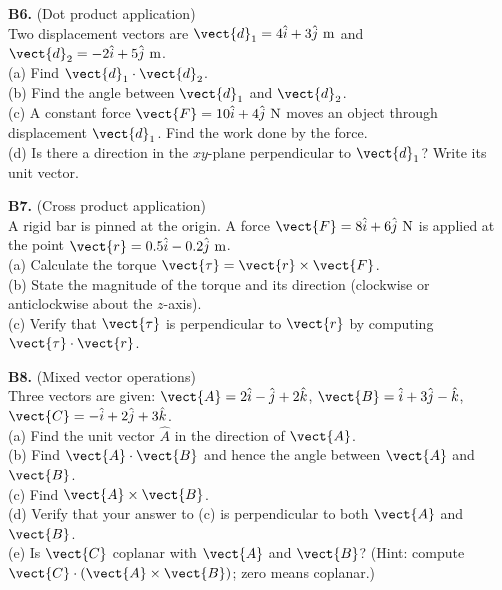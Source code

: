 \begin{exercisebox}[2]
\textbf{B6.} (Dot product application)\\
Two displacement vectors are
$\vect{d}_1 = 4\hat{i} + 3\hat{j}\ \text{m}$ and
$\vect{d}_2 = -2\hat{i} + 5\hat{j}\ \text{m}$.\\[4pt]
(a) Find $\vect{d}_1 \cdot \vect{d}_2$.\\
(b) Find the angle between $\vect{d}_1$ and $\vect{d}_2$.\\
(c) A constant force $\vect{F} = 10\hat{i} + 4\hat{j}\ \text{N}$
moves an object through displacement $\vect{d}_1$.
Find the work done by the force.\\
(d) Is there a direction in the $xy$-plane perpendicular
to $\vect{d}_1$? Write its unit vector.
\hfill{}

\vspace{0.4cm}

\textbf{B7.} (Cross product application)\\
A rigid bar is pinned at the origin. A force
$\vect{F} = 8\hat{i} + 6\hat{j}\ \text{N}$
is applied at the point
$\vect{r} = 0.5\hat{i} - 0.2\hat{j}\ \text{m}$.\\[4pt]
(a) Calculate the torque $\vect{\tau} = \vect{r}\times\vect{F}$.\\
(b) State the magnitude of the torque and its direction
(clockwise or anticlockwise about the $z$-axis).\\
(c) Verify that $\vect{\tau}$ is perpendicular to $\vect{r}$
by computing $\vect{\tau}\cdot\vect{r}$.
\hfill{}

\vspace{0.4cm}

\textbf{B8.} (Mixed vector operations)\\
Three vectors are given:
$\vect{A} = 2\hat{i} - \hat{j} + 2\hat{k}$,\;
$\vect{B} = \hat{i} + 3\hat{j} - \hat{k}$,\;
$\vect{C} = -\hat{i} + 2\hat{j} + 3\hat{k}$.\\[4pt]
(a) Find the unit vector $\hat{A}$ in the direction of
$\vect{A}$.\\
(b) Find $\vect{A}\cdot\vect{B}$ and hence the angle
between $\vect{A}$ and $\vect{B}$.\\
(c) Find $\vect{A}\times\vect{B}$.\\
(d) Verify that your answer to (c) is perpendicular to
both $\vect{A}$ and $\vect{B}$.\\
(e) Is $\vect{C}$ coplanar with $\vect{A}$ and $\vect{B}$?
(Hint: compute $\vect{C}\cdot(\vect{A}\times\vect{B})$;
zero means coplanar.)
\hfill{}

\end{exercisebox}
